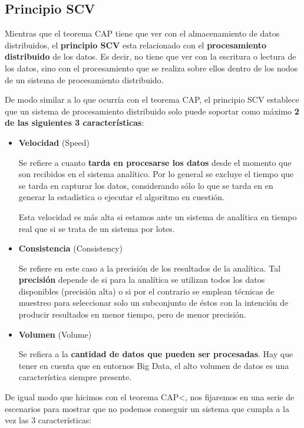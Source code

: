 \subsection{Principio SCV}
Mientras que el teorema CAP tiene que ver con el almacenamiento de datos distribuidos, el \textbf{principio SCV} esta relacionado con el \textbf{procesamiento distribuido} de los datos. Es decir, no tiene que ver con la escritura o lectura de los datos, sino con el procesamiento que se realiza sobre ellos dentro de los nodos de un sistema de procesamiento distribuido. 

De modo similar a lo que ocurría con el teorema CAP, el principio SCV establece que un sistema de procesamiento distribuido solo puede soportar como máximo \textbf{2 de las siguientes 3 características}:

\begin{itemize}
	\item \textbf{Velocidad} (Speed)
	
	Se refiere a cuanto \textbf{tarda en procesarse los datos} desde el momento que son recibidos en el sistema analítico. Por lo general se excluye el tiempo que se tarda en capturar los datos, considerando sólo lo que se tarda en en generar la estadística o ejecutar el algoritmo en cuestión.
	
	Esta velocidad es más alta si estamos ante un sistema de analítica en tiempo real que si se trata de un sistema por lotes.
	
	\item \textbf{Consistencia} (Consistency)
	
	Se refiere en este caso a la precisión de los resultados de la analítica. Tal \textbf{precisión} depende de si para la analítica se utilizan todos los datos disponibles (precisión alta) o si por el contrario se emplean técnicas de muestreo para seleccionar solo un subconjunto de éstos con la intención de producir resultados en menor tiempo, pero de menor precisión.
	
	\item \textbf{Volumen} (Volume)
	
	Se refiera a la \textbf{cantidad de datos que pueden ser procesadas}. Hay que tener en cuenta que en entornos Big Data, el alto volumen de datos es una característica siempre presente. 
\end{itemize}

De igual modo que hicimos con el teorema CAP<, nos fijaremos en una serie de escenarios para mostrar que no podemos conseguir  un sistema que cumpla a la vez las 3 características:

